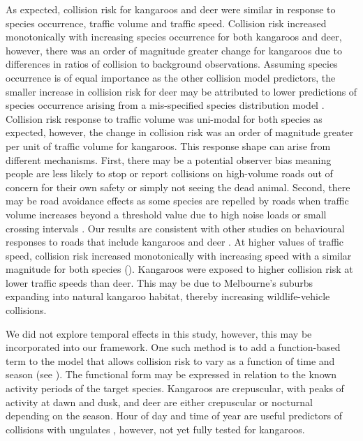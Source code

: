 As expected, collision risk for kangaroos and deer were similar in response to species occurrence, traffic volume and traffic speed.  Collision risk increased monotonically with increasing species occurrence for both kangaroos and deer, however, there was an order of magnitude greater change for kangaroos due to differences in ratios of collision to background observations.  Assuming species occurrence is of equal importance as the other collision model predictors, the smaller increase in collision risk for deer may be attributed to lower predictions of species occurrence arising from a mis-specified species distribution model \citep{guil15}.  Collision risk response to traffic volume was uni-modal for both species as expected, however, the change in collision risk was an order of magnitude greater per unit of traffic volume for kangaroos.  This response shape can arise from different mechanisms.  First, there may be a potential observer bias meaning people are less likely to stop or report collisions on high-volume roads out of concern for their own safety or simply not seeing the dead animal.  Second, there may be road avoidance effects as some species are repelled by roads when traffic volume increases beyond a threshold value due to high noise loads or small crossing intervals \citep[see][]{vanl04,seil05,gagn07}.  Our results are consistent with other studies on behavioural responses to roads that include kangaroos and deer \citep[see][]{jaco16}.  At higher values of traffic speed, collision risk increased monotonically with increasing speed with a similar magnitude for both species ().  Kangaroos were exposed to higher collision risk at lower traffic speeds than deer.  This may be due to Melbourne’s suburbs expanding into natural kangaroo habitat, thereby increasing wildlife-vehicle collisions.

We did not explore temporal effects in this study, however, this may be incorporated into our framework.  One such method is to add a function-based term to the model that allows collision risk to vary as a function of time and season (see ). The functional form may be expressed in relation to the known activity periods of the target species. Kangaroos are crepuscular, with peaks of activity at dawn and dusk, and deer are either crepuscular or nocturnal depending on the season.  Hour of day and time of year are useful predictors of collisions with ungulates \citep{meis14,moun09}, however, not yet fully tested for kangaroos.

